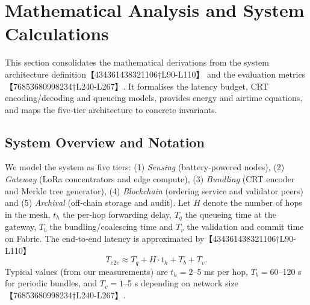 \documentclass[12pt,onecolumn]{IEEEtran} %
\begin{document}
\section{Mathematical Analysis and System Calculations}
\label{sec:math-analysis}
This section consolidates the mathematical derivations from the system architecture
definition【434361438321106†L90-L110】 and the evaluation metrics【76853680998234†L240-L267】.
It formalises the latency budget, CRT encoding/decoding and queueing models, provides
energy and airtime equations, and maps the five‑tier architecture to concrete invariants.

\subsection{System Overview and Notation}
We model the system as five tiers: (1) \emph{Sensing} (battery‑powered nodes),
(2) \emph{Gateway} (LoRa concentrators and edge compute), (3) \emph{Bundling} (CRT encoder
and Merkle tree generator), (4) \emph{Blockchain} (ordering service and validator peers) and
(5) \emph{Archival} (off‑chain storage and audit).  Let \(H\) denote the number of hops in
the mesh, \(t_h\) the per‑hop forwarding delay, \(T_q\) the queueing time at the gateway,
\(T_b\) the bundling/coalescing time and \(T_v\) the validation and commit time on Fabric.
The end‑to‑end latency is approximated by【434361438321106†L90-L110】
\begin{equation}
T_{e2e} \approx T_q + H \cdot t_h + T_b + T_v.
\end{equation}
Typical values (from our measurements) are \(t_h=2\)–5 ms per hop, \(T_b=60\)–120 s for
periodic bundles, and \(T_v=1\)–5 s depending on network size【76853680998234†L240-L267】.
\end{document}
